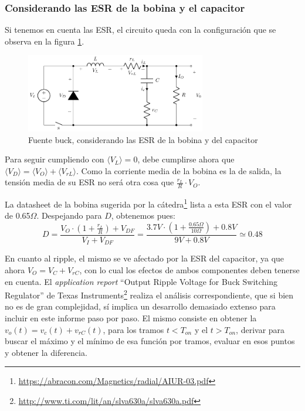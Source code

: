 \documentclass[e4_tp1_main.tex]{subfiles}
\begin{document}
\subsubsection{Considerando las ESR de la bobina y el capacitor}

Si tenemos en cuenta las ESR, el circuito queda con la configuraci\'on que se observa en la figura \ref{fig:buck-esrs}.

\begin{figure}[ht]
	\centering
	\includegraphics[width=0.7\textwidth]{images/ej2/buck_esrs.pdf}
	\caption{Fuente buck, considerando las ESR de la bobina y del capacitor}
	\label{fig:buck-esrs}
\end{figure}


Para seguir cumpliendo con $\langle V_L \rangle = 0$, debe cumplirse ahora que $\langle V_D \rangle = \langle V_O \rangle + \langle V_{rL} \rangle$. Como la corriente media de la bobina es la de salida, la tensi\'on media de su ESR no ser\'a otra cosa que $\frac{r_L}{R} \cdot V_O$. 

La datasheet de la bobina sugerida por la 
c\'atedra\footnote{
	\url{https://abracon.com/Magnetics/radial/AIUR-03.pdf}
} lista a esta ESR con el valor de 0.65$\Omega$.
Despejando para $D$, obtenemos pues:
\begin{equation}
	D = \frac{V_O \cdot \left( 1+ \frac{r_L}{R}\right)+ V_{DF}}{V_I + V_{DF}} 
= \frac{3.7V \cdot \left( 1+ \frac{0.65\Omega}{10\Omega}\right) + 0.8V}{9V + 0.8V} 
\simeq 0.48 
\end{equation}


En cuanto al ripple, el mismo se ve afectado por la ESR del capacitor, ya que ahora $V_O = V_C + V_{rC}$, con lo cual los efectos de ambos componentes deben tenerse en cuenta. El \textit{application report} ``Output Ripple Voltage for Buck Switching Regulator'' de Texas Instruments\footnote{ 
	\url{http://www.ti.com/lit/an/slva630a/slva630a.pdf}
} realiza el an\'alisis correspondiente, que si bien no es de gran complejidad, s\'i implica un desarrollo demasiado extenso para incluir en este informe paso por paso. El mismo consiste en obtener la $v_o(t) = v_c(t) + v_{rC}(t)$, para los tramos $t<T_{on}$ y el $t>T_{on}$, derivar para buscar el m\'aximo y el m\'inimo de esa funci\'on por tramos, evaluar en esos puntos y obtener la diferencia.
\end{document}
